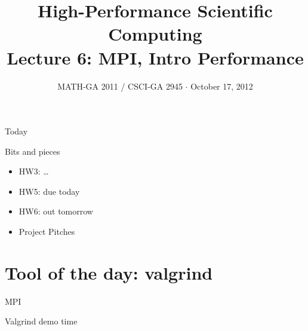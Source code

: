 \documentclass[english,compress]{beamer}
\begin{document}

\title{High-Performance Scientific Computing\\Lecture 6: MPI, Intro Performance}

\date{MATH-GA 2011 / CSCI-GA 2945 $\cdot$ October 17, 2012}

\frame{\titlepage}

\begin{frame}{Today}
  \tableofcontents[hideallsubsections]
\end{frame}
\begin{frame}{Bits and pieces}
  \begin{itemize}
    \item HW3: \dots
    \item HW5: due today
    \item HW6: out tomorrow
    \item Project Pitches
  \end{itemize}
\end{frame}
\section{Tool of the day: valgrind}
\begin{frame}{MPI}
  \begin{center}
  \Huge Valgrind demo time
  \end{center}
\end{frame}
\end{document}
